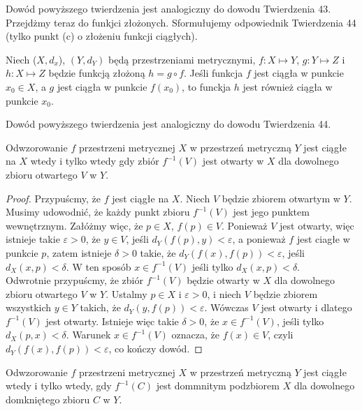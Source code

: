 \documentclass[leqno]{article}
\begin{document}
\begin{justify}
Dowód powyższego twierdzenia jest analogiczny do dowodu Twierdzenia 43. \\
Przejdżmy teraz do funkjci złożonych. Sformułujemy odpowiednik Twierdzenia 44 (tylko punkt (c) o złożeniu funkcji ciągłych).

\begin{theorem}
{
    Niech ($X, d_x$), $(Y, d_Y)$ będą przestrzeniami metrycznymi, $f : X \mapsto Y$, $g : Y \mapsto Z$ i $h : X \mapsto Z$ będzie funkcją złożoną $h = g \circ f$. Jeśli funkcja $f$ jest ciągła w punkcie $x_0 \in X$, a $g$ jest ciągła w punkcie $f(x_0)$, to funckja $h$ jest również ciągła w punkcie $x_0$.
}
\end{theorem}

Dowód powyższego twierdzenia jest analogiczny do dowodu Twierdzenia 44.

\begin{theorem}
{
    Odwzorowanie $f$ przestrzeni metrycznej $X$ w przestrzeń metryczną $Y$ jest ciągłe na $X$ wtedy i tylko wtedy gdy zbiór $f^{-1}(V)$ jest otwarty w $X$ dla dowolnego zbioru otwartego $V$ w $Y$.
}
\end{theorem}

\begin{proof}
    Przypuścmy, że $f$ jest ciągłe na $X$. Niech $V$ będzie zbiorem otwartym w $Y$. Musimy udowodnić, że każdy punkt zbioru $f^{-1}(V)$ jest jego punktem wewnętrznym.
    Załóżmy więc, że $p \in X$, $f(p) \in V$. Ponieważ $V$ jest otwarty, więc istnieje takie $\varepsilon > 0$, 
    że $y \in V$, jeśli $d_Y(f(p),y) < \varepsilon$, a ponieważ $f$ jest ciagłe w punkcie $p$, zatem istnieje $\delta > 0$
    takie, że $d_Y(f(x), f(p)) < \varepsilon$, jeśli $d_X(x, p) < \delta$. W ten sposób $x \in f^{-1}(V)$ jeśli tylko
    $d_X(x, p) < \delta$. \\
    Odwrotnie przypuścmy, że zbiór $f^{-1}(V)$ będzie otwarty w $X$ dla dowolnego zbioru otwartego $V$ w $Y$.
    Ustalmy $p \in X$ i $\varepsilon > 0$, i niech $V$ będzie zbiorem wszystkich $y \in Y$ takich, że
    $d_Y(y, f(p)) < \varepsilon$. Wówczas $V$ jest otwarty i dlatego $f^{-1}(V)$ jest otwarty.
    Istnieje więc takie $\delta > 0$, że $x \in f^{-1}(V)$, jeśli tylko $d_X(p, x) < \delta$. 
    Warunek $x \in f^{-1}(V)$ oznacza, że $f(x) \in V$, czyli $d_Y(f(x), f(p)) < \varepsilon$, co kończy dowód.
\end{proof}

\begin{wniosek}
{
    Odwzorowanie $f$ przestrzeni metrycznej $X$ w przestrzeń metryczną $Y$ jest ciągłe wtedy i tylko wtedy, gdy
    $f^{-1}(C)$ jest dommnitym podzbiorem $X$ dla dowolnego domkniętego zbioru $C$ w $Y$.
}
\end{wniosek}


\end{justify}
\end{document}
